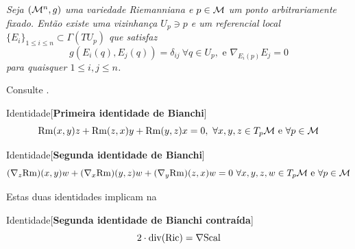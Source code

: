     \begin{lema}\label{refg}
        \textit{
        Seja $(\mathcal{M}^n, g)$ uma variedade Riemanniana e $p \in \mathcal{M}$ um ponto arbitrariamente fixado. Então existe uma vizinhança $U_p \ni p$ e um referencial local $\{E_i\}_{1 \leq i \leq n} \subset \Gamma(TU_p)$ que satisfaz
        \[
        g(E_i(q), E_j(q)) = \delta_{ij} \ \forall q \in U_p, \text{ e } \nabla_{E_i(p)} E_j = 0
        \]
        para quaisquer $1 \leq i, j \leq n$.}
        \end{lema}

        \begin{demm}
            Consulte .
        \end{demm}

        \begin{namedthm}{Identidade}[\textbf{Primeira identidade de Bianchi}]
            \[
            \mathrm{Rm}(x, y)z + \mathrm{Rm}(z, x)y + \mathrm{Rm}(y, z)x = 0, \ \forall x, y, z \in T_p \mathcal{M} \text{ e } \forall p \in \mathcal{M}
            \]
            \end{namedthm}
            \begin{namedthm}{Identidade}[\textbf{Segunda identidade de Bianchi}]
            \[
            (\nabla_z \mathrm{Rm})(x, y)w + (\nabla_x \mathrm{Rm})(y, z)w + (\nabla_y \mathrm{Rm})(z, x)w = 0 \ \forall x, y, z, w \in T_p \mathcal{M} \text{ e } \forall p \in \mathcal{M}
            \]
            \end{namedthm}
            Estas duas identidades implicam na
            \begin{namedthm}{Identidade}[\textbf{Segunda identidade de Bianchi contraída}]
            \begin{equation}\label{segbianchi}
            2 \cdot \operatorname{div}(\mathrm{Ric}) = \nabla \mathrm{Scal}
            \end{equation}
            \end{namedthm}

